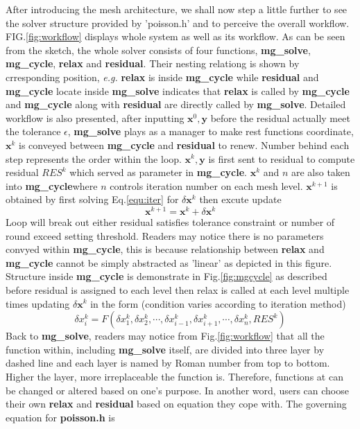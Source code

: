 \documentclass[a4paper]{article}
\newcommand{\func}[1]{\textbf{\textcolor{function}{#1}}}
\begin{document}
After introducing the mesh architecture, we shall now step a little further to see the solver structure provided by 'poisson.h' and to perceive the overall workflow. FIG.\ref{fig:workflow} displays whole system as well as its workflow. As can be seen from the sketch, the whole solver consists of four functions, \func{mg\_solve}, \func{mg\_cycle}, \func{relax} and \func{residual}. Their nesting relationg is shown by crresponding position, \emph{e.g.} \func{relax} is inside \func{mg\_cycle} while \func{residual} and \func{mg\_cycle} locate inside \func{mg\_solve} indicates that \func{relax} is called by \func{mg\_cycle} and \func{mg\_cycle} along with \func{residual} are directly called by \func{mg\_solve}. Detailed workflow is also presented, after inputting $ \mathbf{x}^0, \mathbf{y}$ before the residual actually meet the tolerance $\epsilon$, \func{mg\_solve} plays as a manager to make rest functions coordinate, $ \mathbf{x}^k$ is conveyed between \func{mg\_cycle} and \func{residual} to renew. Number behind each step represents the order within the loop. $ \mathbf{x}^k, \mathbf{y}$ is first sent to residual to compute residual $RES^k$ which served as parameter in \func{mg\_cycle}. $ \mathbf{x}^k$ and $n$ are also taken into \func{mg\_cycle}where $n$ controls iteration number on each mesh level. $ \mathbf{x}^{k+1}$ is obtained by first solving Eq.\ref{equ:iter} for $\delta \mathbf{x}^k$ then excute update
\begin{equation}
  \mathbf{x}^{k+1} = \mathbf{x}^k + \delta \mathbf{x}^k
\end{equation}
Loop will break out either residual satisfies tolerance constraint or number of round exceed setting threshold. Readers may notice there is no parameters convyed within \func{mg\_cycle}, this is because relationship between \func{relax} and \func{mg\_cycle} cannot be simply abstracted as 'linear' as depicted in this figure. Structure inside \func{mg\_cycle} is demonstrate in Fig.\ref{fig:mgcycle} as described before residual is assigned to each level then relax is called at each level multiple times updating $\delta \mathbf{x}^k$ in the form (condition varies according to iteration method)
\begin{equation}
  \delta x^k_i = F(\delta x^k_1,\delta x^k_2,\cdots,\delta x^k_{i-1},\delta x^k_{i+1},\cdots,\delta x_n^k, RES^k)
\end{equation}
Back to \func{mg\_solve}, readers may notice from Fig.\ref{fig:workflow} that all the function within, including \func{mg\_solve} itself, are divided into three layer by dashed line and each layer is named by Roman number from top to bottom. Higher the layer, more irreplaceable the function is. Therefore, functions at  can be changed or altered based on one's purpose. In another word, users can choose their own \func{relax} and \func{residual} based on equation they cope with. The governing equation for \textbf{poisson.h} is
\end{document}
